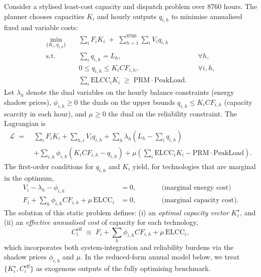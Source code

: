 \documentclass[preprint,authoryear,12pt]{elsarticle}
\begin{document}
Consider a stylised least-cost capacity and dispatch problem over 8760 hours.
The planner chooses capacities $K_i$ and hourly outputs $q_{i,h}$ to minimise
annualised fixed and variable costs:
\begin{equation}
\begin{aligned}
\min_{\{K_i, q_{i,h}\}} \quad 
 & \sum_i F_i K_i \;+\; \sum_{h=1}^{8760} \sum_i V_i q_{i,h} \\
\text{s.t.} \quad 
 & \sum_i q_{i,h} = L_h, && \forall h, \\
 & 0 \le q_{i,h} \le K_i CF_{i,h}, && \forall i,h, \\
 & \sum_i \mathrm{ELCC}_i K_i \;\ge\; \mathrm{PRM}\cdot \mathrm{PeakLoad}. &&
\end{aligned}
\end{equation}
Let $\lambda_h$ denote the dual variables on the hourly balance constraints
(energy shadow prices), $\phi_{i,h}\ge 0$ the duals on the upper bounds
$q_{i,h} \le K_i CF_{i,h}$ (capacity scarcity in each hour), and
$\mu \ge 0$ the dual on the reliability constraint. The Lagrangian is
\begin{equation}
\begin{aligned}
\mathcal{L} \;=\;
 & \sum_i F_i K_i + \sum_{h,i} V_i q_{i,h}
 + \sum_h \lambda_h\!\left(L_h - \sum_i q_{i,h}\right) \\
 & + \sum_{i,h} \phi_{i,h}\!\left(K_i CF_{i,h} - q_{i,h}\right)
 + \mu\!\left(\sum_i \mathrm{ELCC}_i K_i - \mathrm{PRM}\cdot\mathrm{PeakLoad}\right).
\end{aligned}
\end{equation}
The first-order conditions for $q_{i,h}$ and $K_i$ yield, for technologies
that are marginal in the optimum,
\begin{align}
V_i - \lambda_h - \phi_{i,h} & = 0, \qquad &&\text{(marginal energy cost)} \\
F_i + \sum_h \phi_{i,h} CF_{i,h} + \mu\,\mathrm{ELCC}_i & = 0,
   &&\text{(marginal capacity cost).}
\end{align}
The solution of this static problem defines:
(i) an \emph{optimal capacity vector} $K_i^{\star}$, and
(ii) an \emph{effective annualised cost} of capacity for each technology,
\begin{equation}
C_i^{\mathrm{eff}}
\;\equiv\;
F_i + \sum_h \phi_{i,h} CF_{i,h} + \mu\,\mathrm{ELCC}_i,
\end{equation}
which incorporates both system-integration and reliability burdens
via the shadow prices $\phi_{i,h}$ and $\mu$.
In the reduced-form annual model below, we treat
$\{K_i^{\star}, C_i^{\mathrm{eff}}\}$ as exogenous outputs of the
fully optimising benchmark.
\medskip
\end{document}
